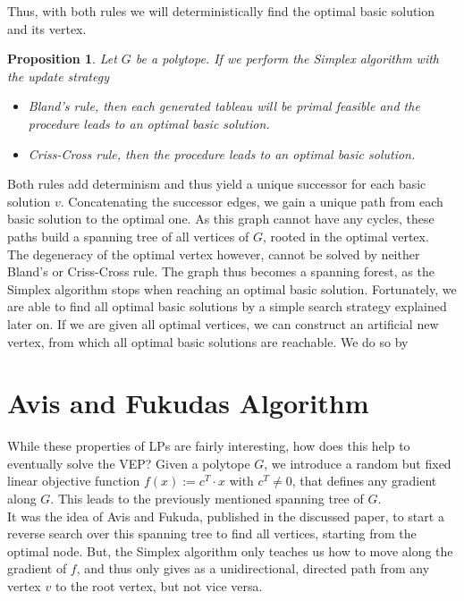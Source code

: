 \documentclass[a4paper, 11pt]{article}
\newtheorem{proposition}{Proposition}
\begin{document}
Thus, with both rules we will deterministically find the optimal basic solution and its vertex. 

\begin{proposition}
	\label{PropoBland}
	Let $G$ be a polytope. If we perform the Simplex algorithm with the update strategy
	\begin{itemize}
		\item Bland's rule, then each generated tableau will be primal feasible and the procedure leads to an optimal basic solution.
		\item Criss-Cross rule, then the procedure leads to an optimal basic solution.
	\end{itemize}
\end{proposition}

Both rules add determinism and thus yield a unique successor for each basic solution $v$. Concatenating the successor edges, we gain a unique path from each basic solution to the optimal one. As this graph cannot have any cycles, these paths build a spanning tree of all vertices of $G$, rooted in the optimal vertex.\\

The degeneracy of the optimal vertex however, cannot be solved by neither Bland's or Criss-Cross rule. The graph thus becomes a spanning forest, as the Simplex algorithm stops when reaching an optimal basic solution. Fortunately, we are able to find all optimal basic solutions by a simple search strategy explained later on. If we are given all optimal vertices, we can construct an artificial new vertex, from which all optimal basic solutions are reachable. We do so by

\section{Avis and Fukudas Algorithm}

While these properties of LPs are fairly interesting, how does this help to eventually solve the VEP? Given a polytope $G$,  we introduce a random but fixed linear objective function $f(x):=c^T\cdot x$ with $c^T\neq 0$, that defines any gradient along $G$. This leads to the previously mentioned spanning tree of $G$. \\

It was the idea of Avis and Fukuda, published in the discussed paper, to start a reverse search over this spanning tree to find all vertices, starting from the optimal node. But, the Simplex algorithm only teaches us how to move along the gradient of $f$, and thus only gives as a unidirectional, directed path from any vertex $v$ to the root vertex, but not vice versa. \\
\end{document}
